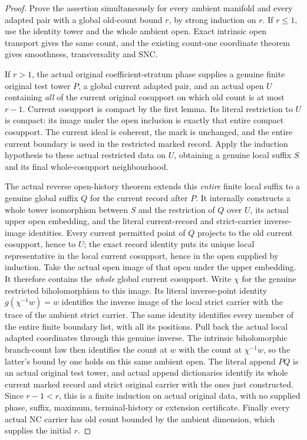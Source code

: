 \begin{proof}
Prove the assertion simultaneously for every ambient manifold and every
adapted pair with a global old-count bound $r$, by strong induction on
$r$. If $r\le1$, use the identity tower and the whole ambient open.
Exact intrinsic open transport gives the same count, and the existing
count-one coordinate theorem gives smoothness, transversality and SNC.

If $r>1$, the actual original coefficient-stratum phase supplies a genuine
finite original test tower $P$, a global current adapted pair, and an
actual open $U$ containing \emph{all} of the current original cosupport
on which old count is at most $r-1$. Current cosupport is compact by the
first lemma. Its literal restriction to $U$ is compact: its image under
the open inclusion is exactly that entire compact cosupport. The current
ideal is coherent, the mark is unchanged, and the entire current boundary
is used in the restricted marked record. Apply the induction hypothesis
to these actual restricted data on $U$, obtaining a genuine local suffix
$S$ and its final whole-cosupport neighbourhood.

The actual reverse open-history theorem extends this \emph{entire}
finite local suffix to a genuine global suffix $Q$ for the current record
after $P$. It internally constructs a whole tower isomorphism between
$S$ and the restriction of $Q$ over $U$, its actual upper open embedding,
and the literal current-record and strict-carrier inverse-image
identities. Every current permitted point of $Q$ projects to the old
current cosupport, hence to $U$; the exact record identity puts its unique
local representative in the local current cosupport, hence in the open
supplied by induction. Take the actual open image of that open under the
upper embedding. It therefore contains the \emph{whole} global current
cosupport. Write $\chi$ for the genuine restricted biholomorphism to this
image. Its literal inverse-point identity $g(\chi^{-1}w)=w$ identifies the
inverse image of the local strict carrier with the trace of the ambient
strict carrier. The same identity identifies every member of the entire
finite boundary list, with all its positions. Pull back the actual local
adapted coordinates through this genuine inverse. The intrinsic
biholomorphic branch-count law then identifies the count at $w$ with
the count at $\chi^{-1}w$, so the latter's bound by one holds on this
same ambient open. The literal append $P Q$ is an actual
original test tower, and actual append dictionaries identify its whole
current marked record and strict original carrier with the ones just
constructed. Since $r-1<r$, this is a finite induction on actual original
data, with no supplied phase, suffix, maximum, terminal-history or
extension certificate. Finally every actual NC carrier has old count
bounded by the ambient dimension, which supplies the initial $r$.
\end{proof}

